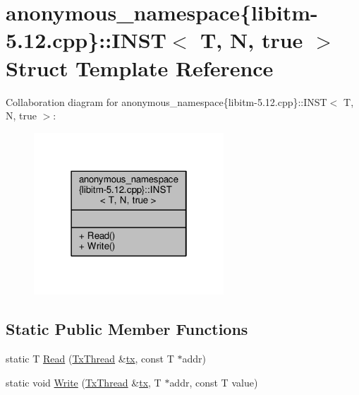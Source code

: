\hypertarget{structanonymous__namespace_02libitm-5_812_8cpp_03_1_1INST_3_01T_00_01N_00_01true_01_4}{\section{anonymous\-\_\-namespace\{libitm-\/5.12.cpp\}\-:\-:I\-N\-S\-T$<$ T, N, true $>$ Struct Template Reference}
\label{structanonymous__namespace_02libitm-5_812_8cpp_03_1_1INST_3_01T_00_01N_00_01true_01_4}
}


Collaboration diagram for anonymous\-\_\-namespace\{libitm-\/5.12.cpp\}\-:\-:I\-N\-S\-T$<$ T, N, true $>$\-:
\nopagebreak
\begin{figure}[H]
\begin{center}
\leavevmode
\includegraphics[width=202pt]{structanonymous__namespace_02libitm-5_812_8cpp_03_1_1INST_3_01T_00_01N_00_01true_01_4__coll__graph}
\end{center}
\end{figure}
\subsection*{Static Public Member Functions}
\begin{DoxyCompactItemize}
\item 
static T \hyperlink{structanonymous__namespace_02libitm-5_812_8cpp_03_1_1INST_3_01T_00_01N_00_01true_01_4_a5a6f21bd0e9de35773b7de0d535c0d6f}{Read} (\hyperlink{structstm_1_1TxThread}{Tx\-Thread} \&\hyperlink{stmskip_8cc_a0f1c58699b83ce5a08bd9ee859250d72}{tx}, const T $\ast$addr)
\item 
static void \hyperlink{structanonymous__namespace_02libitm-5_812_8cpp_03_1_1INST_3_01T_00_01N_00_01true_01_4_a6c2e185094dc71db3b7ed059edd9f252}{Write} (\hyperlink{structstm_1_1TxThread}{Tx\-Thread} \&\hyperlink{stmskip_8cc_a0f1c58699b83ce5a08bd9ee859250d72}{tx}, T $\ast$addr, const T value)
\end{DoxyCompactItemize}



